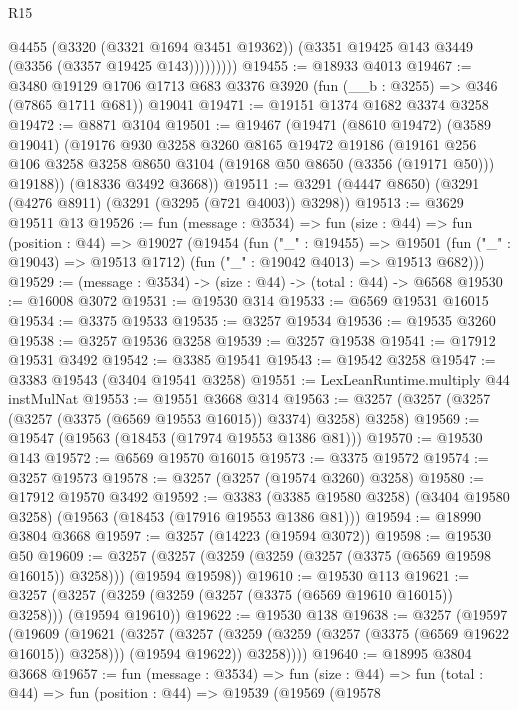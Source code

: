 \begin{lexlean}{R15}
\begin{coremodule}
                @4455
                (@3320 (@3321 @1694 @3451 @19362))
                (@3351 @19425 @143 @3449 (@3356 (@3357 @19425 @143)))))))))
@19455 := @18933 @4013
@19467 := @3480
    @19129
    @1706
    @1713
    @683
    @3376
    @3920
    (fun (__b : @3255) => @346 (@7865 @1711 @681))
    @19041
@19471 := @19151 @1374 @1682 @3374 @3258
@19472 := @8871 @3104
@19501 := @19467
    (@19471
      (@8610 @19472)
      (@3589 @19041)
      (@19176
        @930
        @3258
        @3260
        @8165
        @19472
        @19186
        (@19161 @256 @106 @3258 @3258 @8650 @3104 (@19168 @50 @8650 (@3356 (@19171 @50))) @19188))
      (@18336 @3492 @3668))
@19511 := @3291 (@4447 @8650) (@3291 (@4276 @8911) (@3291 (@3295 (@721 @4003)) @3298))
@19513 := @3629 @19511 @13
@19526 := fun (message : @3534) =>
  fun (size : @44) =>
  fun (position : @44) =>
  @19027
    (@19454
      (fun ("_" : @19455) =>
      @19501 (fun ("_" : @19043) => @19513 @1712) (fun ("_" : @19042 @4013) => @19513 @682)))
@19529 := (message : @3534) -> (size : @44) -> (total : @44) -> @6568
@19530 := @16008 @3072
@19531 := @19530 @314
@19533 := @6569 @19531 @16015
@19534 := @3375 @19533
@19535 := @3257 @19534
@19536 := @19535 @3260
@19538 := @3257 @19536 @3258
@19539 := @3257 @19538
@19541 := @17912 @19531 @3492
@19542 := @3385 @19541
@19543 := @19542 @3258
@19547 := @3383 @19543 (@3404 @19541 @3258)
@19551 := LexLeanRuntime.multiply @44 instMulNat
@19553 := @19551 @3668 @314
@19563 := @3257 (@3257 (@3257 (@3257 (@3375 (@6569 @19553 @16015)) @3374) @3258) @3258)
@19569 := @19547 (@19563 (@18453 (@17974 @19553 @1386 @81)))
@19570 := @19530 @143
@19572 := @6569 @19570 @16015
@19573 := @3375 @19572
@19574 := @3257 @19573
@19578 := @3257 (@3257 (@19574 @3260) @3258)
@19580 := @17912 @19570 @3492
@19592 := @3383
    (@3385 @19580 @3258)
    (@3404 @19580 @3258)
    (@19563 (@18453 (@17916 @19553 @1386 @81)))
@19594 := @18990 @3804 @3668
@19597 := @3257 (@14223 (@19594 @3072))
@19598 := @19530 @50
@19609 := @3257 (@3257 (@3259 (@3259 (@3257 (@3375 (@6569 @19598 @16015)) @3258))) (@19594 @19598))
@19610 := @19530 @113
@19621 := @3257 (@3257 (@3259 (@3259 (@3257 (@3375 (@6569 @19610 @16015)) @3258))) (@19594 @19610))
@19622 := @19530 @138
@19638 := @3257
    (@19597
      (@19609
        (@19621
          (@3257
            (@3257 (@3259 (@3259 (@3257 (@3375 (@6569 @19622 @16015)) @3258))) (@19594 @19622))
            @3258))))
@19640 := @18995 @3804 @3668
@19657 := fun (message : @3534) =>
  fun (size : @44) =>
  fun (total : @44) =>
  fun (position : @44) =>
  @19539
    (@19569
      (@19578

\end{coremodule}
\end{lexlean}
